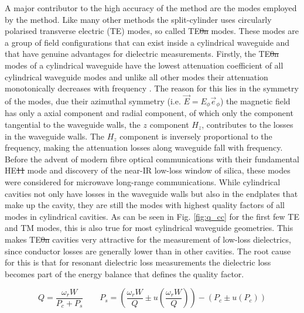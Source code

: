 A major contributor to the high accuracy of the method are the modes employed by the method. Like many other methods the split-cylinder uses circularly polarised transverse electric (TE) modes, so called TE\st{0n} modes. These modes are a group of field configurations that can exist inside a cylindrical waveguide and that have genuine advantages for dielectric measurements. Firstly, the TE\st{0n} modes of a cylindrical waveguide have the lowest attenuation coefficient of all cylindrical waveguide modes and unlike all other modes their attenuation monotonically decreases with frequency \cite{balanis}. The reason for this lies in the symmetry of the modes, due their azimuthal symmetry (i.e. $\vec{E}=E_{\phi}\vec{e}_\phi$) the magnetic field has only a axial component and radial component, of which only the component tangential to the waveguide walls, the $z$ component $H_z$, contributes to the losses in the waveguide walls. The $H_z$ component is inversely proportional to the frequency, making the attenuation losses along waveguide fall with frequency. Before the advent of modern fibre optical communications with their fundamental HE\st{11} mode and discovery of the near-IR low-loss window of silica, these modes were considered for microwave long-range communications. While cylindrical cavities not only have losses in the waveguide walls but also in the endplates that make up the cavity, they are still the modes with highest quality factors of all modes in cylindrical cavities. As can be seen in Fig. \ref{fig:q_cc} for the first few TE and TM modes, this is also true for most cylindrical waveguide geometries. This makes TE\st{0n} cavities very attractive for the measurement of low-loss dielectrics, since conductor losses are generally lower than in other cavities. The root cause for this is that for resonant dielectric loss measurements the dielectric loss becomes part of the energy balance that defines the quality factor.

\begin{equation}
Q=\frac{\omega_rW}{P_c+P_s} \qquad P_s = (\frac{\omega_rW}{Q}\pm u(\frac{\omega_rW}{Q}))-(P_c\pm u(P_c))
\end{equation}


